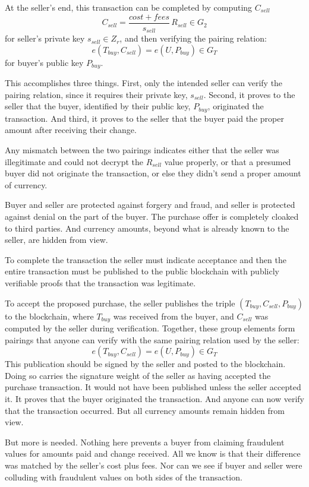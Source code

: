 \documentclass{yellowpaper}
\begin{document}
At the seller's end, this transaction can be completed by computing $C_{sell}$ 
$$ C_{sell} = \frac{cost+fees}{s_{sell}} \, R_{sell} \in G_2$$
for seller's private key $s_{sell} \in Z_r$, 
and then verifying the pairing relation:
$$ e(T_{buy},C_{sell}) = e(U,P_{buy}) \in G_T$$
for buyer's public key $P_{buy}$. 

This accomplishes three things. First, only the intended seller can verify the pairing relation, since it requires their private key, $s_{sell}$. Second, it proves to the seller that the buyer, identified by their public key, $P_{buy}$, originated the transaction. And third, it proves to the seller that the buyer paid the proper amount after receiving their change. 

Any mismatch between the two pairings indicates either that the seller was illegitimate and could not decrypt the $R_{sell}$ value properly, or that a presumed buyer did not originate the transaction, or else they didn't send a proper amount of currency. 

Buyer and seller are protected against forgery and fraud, and seller is protected against denial on the part of the buyer. The purchase offer is completely cloaked to third parties. And currency amounts, beyond what is already known to the seller, are hidden from  view.

To complete the transaction the seller must indicate acceptance and then the entire transaction must be published to the public blockchain with publicly verifiable proofs that the transaction was legitimate. 

To accept the proposed purchase, the seller publishes the triple $(T_{buy}, C_{sell}, P_{buy})$ to the blockchain, where $T_{buy}$ was received from the buyer, and $C_{sell}$ was computed by the seller during verification. Together, these group elements form pairings that anyone can verify with the same pairing relation used by the seller:
$$ e(T_{buy},C_{sell}) = e(U,P_{buy}) \in G_T$$
This publication should be signed by the seller and posted to the blockchain. Doing so carries the signature weight of the seller as having accepted the purchase transaction. It would not have been published unless the seller accepted it. It proves that the buyer originated the transaction. And anyone can now verify that the transaction occurred. But all currency amounts remain hidden from view.

But more is needed. Nothing here prevents a buyer from claiming fraudulent values for amounts paid and change received. All we know is that their difference was matched by the seller's cost plus fees. Nor can we see if buyer and seller were colluding with fraudulent values on both sides of the transaction. 
\end{document}
